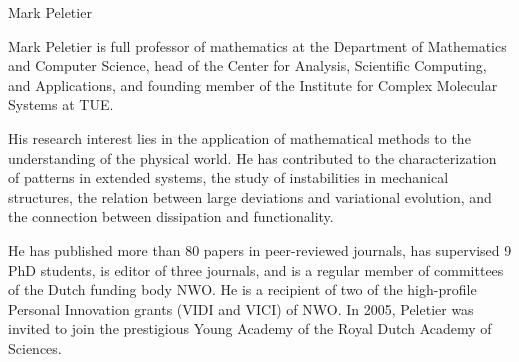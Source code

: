 \begin{participant}[type=leadPI,PM=24,gender=male,salary=5500]{Mark Peletier}


Mark Peletier is full professor of mathematics at the Department of Mathematics and Computer Science, head of the Center for Analysis, Scientific Computing, and Applications, and founding member of the Institute for Complex Molecular Systems at TUE. 

His research interest lies in the application of mathematical methods to the understanding of the physical world. He has contributed to the characterization of patterns in extended systems, the study of instabilities in mechanical structures, the relation between large deviations and variational evolution, and the connection between dissipation and functionality. 

He has published more than 80 papers in peer-reviewed journals, has supervised 9 PhD students, is editor of three journals, and is a regular member of committees of the Dutch funding body NWO. He is a recipient of two of the high-profile Personal Innovation grants (VIDI and VICI) of NWO. In 2005, Peletier was invited to join the prestigious Young Academy of the Royal Dutch Academy of Sciences. 

\end{participant}

